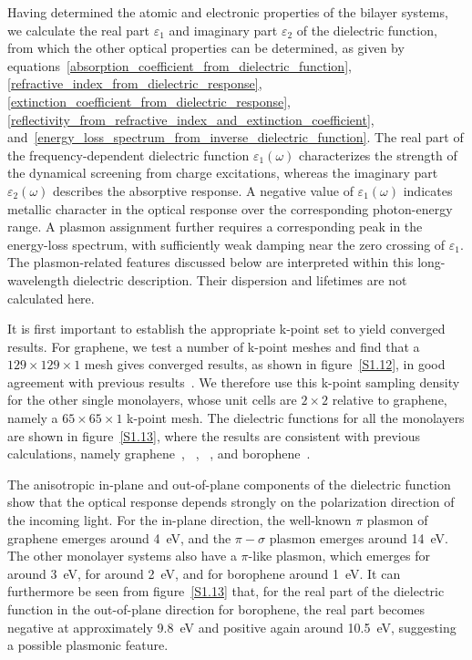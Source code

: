 Having determined the atomic and electronic properties of the bilayer systems,
we calculate the real part $\varepsilon_1$ and imaginary part $\varepsilon_2$ of the dielectric function,
from which the other optical properties can be determined, as given by equations~\eqref{absorption_coefficient_from_dielectric_function},
\eqref{refractive_index_from_dielectric_response},
\eqref{extinction_coefficient_from_dielectric_response},
\eqref{reflectivity_from_refractive_index_and_extinction_coefficient},
and~\eqref{energy_loss_spectrum_from_inverse_dielectric_function}.
The real part of the frequency-dependent dielectric function $\varepsilon_1(\omega)$ characterizes the strength of the dynamical screening from charge excitations,
whereas the imaginary part $\varepsilon_2(\omega)$ describes the absorptive response.
A negative value of $\varepsilon_1(\omega)$ indicates metallic character in the optical response over the corresponding photon-energy range.
A plasmon assignment further requires a corresponding peak in the energy-loss spectrum, with sufficiently weak damping near the zero crossing of $\varepsilon_1$.
The plasmon-related features discussed below are interpreted within this long-wavelength dielectric description.
Their dispersion and lifetimes are not calculated here.

It is first important to establish the appropriate k-point set to yield converged results.
For graphene, we test a number of k-point meshes and find that a $129 \times 129 \times 1$ mesh gives converged results, as shown in figure~\ref{S1.12}, in good agreement with previous results~\cite{warmbier2016}.
We therefore use this k-point sampling density for the other single monolayers, whose unit cells are $2 \times 2$ relative to graphene, namely a $65 \times 65 \times 1$ k-point mesh.
The dielectric functions for all the monolayers are shown in figure~\ref{S1.13}, where the results are consistent with previous calculations, namely graphene~\cite{warmbier2016}, ~\cite{chen2019plasmon,mortazavi2019outstanding}, ~\cite{chang2019b4c3}, and borophene~\cite{huang2017,li2017first}.

The anisotropic in-plane and out-of-plane components of the dielectric function show that the optical response depends strongly on the polarization direction of the incoming light.
For the in-plane direction, the well-known $\pi$ plasmon of graphene emerges around \qty{4}{\electronvolt},
and the $\pi-\sigma$ plasmon emerges around \qty{14}{\electronvolt}.
The other monolayer systems also have a $\pi$-like plasmon,
which emerges for  around \qty{3}{\electronvolt},
for  around \qty{2}{\electronvolt},
and for borophene around \qty{1}{\electronvolt}.
It can furthermore be seen from figure~\ref{S1.13} that, for the real part of the dielectric function in the out-of-plane direction for borophene,
the real part becomes negative at approximately \qty{9.8}{\electronvolt} and positive again around \qty{10.5}{\electronvolt},
suggesting a possible plasmonic feature.

